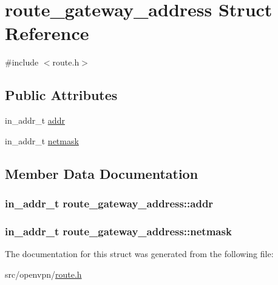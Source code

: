 \hypertarget{structroute__gateway__address}{}\section{route\+\_\+gateway\+\_\+address Struct Reference}
\label{structroute__gateway__address}


{\ttfamily \#include $<$route.\+h$>$}

\subsection*{Public Attributes}
\begin{DoxyCompactItemize}
\item 
in\+\_\+addr\+\_\+t \hyperlink{structroute__gateway__address_a63ded57d206c4b745e541bf51e8fd5b6}{addr}
\item 
in\+\_\+addr\+\_\+t \hyperlink{structroute__gateway__address_a33bd1314cd069f11c22605e5e79756a0}{netmask}
\end{DoxyCompactItemize}


\subsection{Member Data Documentation}
\hypertarget{structroute__gateway__address_a63ded57d206c4b745e541bf51e8fd5b6}{}
\subsubsection[{addr}]{\setlength{\rightskip}{0pt plus 5cm}in\+\_\+addr\+\_\+t route\+\_\+gateway\+\_\+address\+::addr}\label{structroute__gateway__address_a63ded57d206c4b745e541bf51e8fd5b6}
\hypertarget{structroute__gateway__address_a33bd1314cd069f11c22605e5e79756a0}{}
\subsubsection[{netmask}]{\setlength{\rightskip}{0pt plus 5cm}in\+\_\+addr\+\_\+t route\+\_\+gateway\+\_\+address\+::netmask}\label{structroute__gateway__address_a33bd1314cd069f11c22605e5e79756a0}


The documentation for this struct was generated from the following file\+:\begin{DoxyCompactItemize}
\item 
src/openvpn/\hyperlink{route_8h}{route.\+h}\end{DoxyCompactItemize}
